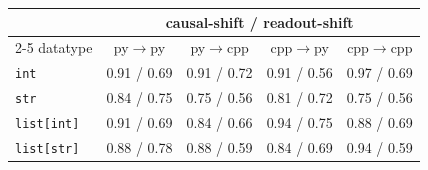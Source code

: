 \begin{tabular}{lcccc}
\toprule
& \multicolumn{4}{c}{causal-shift / readout-shift} \\
\cmidrule(lr){2-5}
datatype & py$\to$py & py$\to$cpp & cpp$\to$py & cpp$\to$cpp \\
\midrule
\texttt{int} & 0.91 / 0.69 & 0.91 / 0.72 & 0.91 / 0.56 & 0.97 / 0.69 \\
\texttt{str} & 0.84 / 0.75 & 0.75 / 0.56 & 0.81 / 0.72 & 0.75 / 0.56 \\
\texttt{list[int]} & 0.91 / 0.69 & 0.84 / 0.66 & 0.94 / 0.75 & 0.88 / 0.69 \\
\texttt{list[str]} & 0.88 / 0.78 & 0.88 / 0.59 & 0.84 / 0.69 & 0.94 / 0.59 \\
\bottomrule
\end{tabular}

